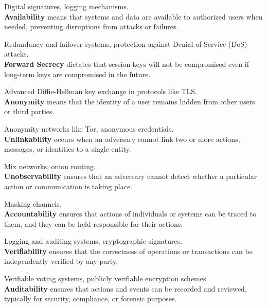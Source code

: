 \documentclass[pdflatex,sn-mathphys-num]{sn-jnl}%
\theoremstyle{thmstyleone}%
\theoremstyle{thmstyletwo}%
\theoremstyle{thmstylethree}%
\begin{document}
 Digital signatures, logging mechanisms.\\


\noindent  \textbf{Availability} means that systems and data are available to authorized users when needed, preventing disruptions from attacks or failures.

 Redundancy and failover systems, protection against Denial of Service (DoS) attacks.\\


\noindent \textbf{Forward Secrecy} dictates that session keys will not be compromised even if long-term keys are compromised in the future.

 Advanced Diffie-Hellman key exchange in protocols like TLS.\\



\noindent\textbf{Anonymity}  means that the identity of a user remains hidden from other users or third parties.

 Anonymity networks like Tor, anonymous credentials.\\


\noindent\textbf{Unlinkability} occurs when an adversary cannot link two or more actions, messages, or identities to a single entity.

 Mix networks, onion routing.\\


\noindent\textbf{Unobservability} ensures that an adversary cannot detect whether a particular action or communication is taking place.

 Masking channels.\\


\noindent \textbf{Accountability} ensures that actions of individuals or systems can be traced to them, and they can be held responsible for their actions.

 Logging and auditing systems, cryptographic signatures.\\


\noindent \textbf{Verifiability}  ensures that the correctness of operations or transactions can be independently verified by any party.

 Verifiable voting systems, publicly verifiable encryption schemes.\\


\noindent \textbf{Auditability}   ensures that actions and events can be recorded and reviewed, typically for security, compliance, or forensic purposes.
\end{document}
